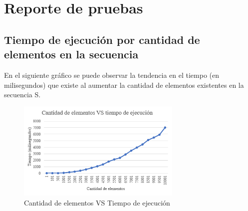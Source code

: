 \documentclass{article}
\begin{document}
\section{Reporte de pruebas}
\subsection{Tiempo de ejecución por cantidad de elementos en la secuencia}
En el siguiente gráfico se puede observar la tendencia en el tiempo (en milisegundos) que existe al aumentar la cantidad de elementos existentes en la secuencia S.
	\begin{figure}[H]
        \centering
        \includegraphics[width=0.7\textwidth]{imagenes/graficoCantidadElementosVSTiempoEjecucion.PNG}
        \caption{Cantidad de elementos VS Tiempo de ejecución}
        \label{fig:ger}
    \end{figure}
    
\end{document}
